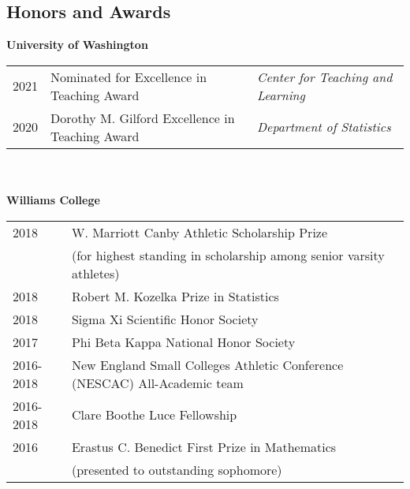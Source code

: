 \documentclass[margin, 10pt]{res} %
\begin{document}
\begin{resume}
{\section{Honors and Awards}
\textbf{University of Washington} \\
\begin{tabular}{l l l}
2021 & Nominated for Excellence in Teaching Award & \emph{Center for Teaching and Learning} \\
2020 & Dorothy M. Gilford Excellence in Teaching Award & \emph{Department of Statistics}
\end{tabular}  \\
\\
\textbf{Williams College} \\
\begin{tabular}{l l }
2018 & W. Marriott Canby Athletic Scholarship Prize   \\
& (for highest standing in scholarship among senior varsity athletes) \\
2018 & Robert M. Kozelka Prize in Statistics   \\
2018&  Sigma Xi Scientific Honor Society \\
2017 & Phi Beta Kappa  National Honor Society \\
2016-2018 & New England Small Colleges Athletic Conference (NESCAC) All-Academic team \\
2016-2018 & Clare Boothe Luce Fellowship \\
2016 & Erastus C. Benedict First Prize in Mathematics \\
& (presented to outstanding sophomore) \\
\end{tabular}

}
\end{resume}
\end{document}
